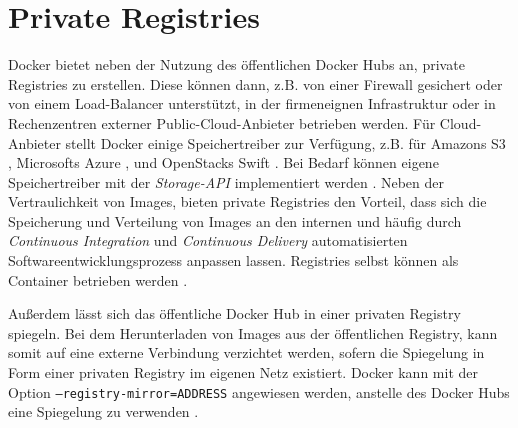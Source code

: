 \documentclass[../main.tex]{subfiles}
\begin{document}



  \section{Private Registries}
    Docker bietet neben der Nutzung des öffentlichen Docker Hubs an, private Registries zu erstellen. Diese können dann, z.B. von einer Firewall gesichert oder von einem Load-Balancer unterstützt, in der firmeneignen Infrastruktur oder in Rechenzentren externer Public-Cloud-Anbieter betrieben werden. Für Cloud-Anbieter stellt Docker einige Speichertreiber zur Verfügung, z.B. für Amazons S3 \cite{dockerStorageDriverS3}, Microsofts Azure \cite{dockerStorageDriverAzure}, und OpenStacks Swift \cite{dockerStorageDriverSwift}. Bei Bedarf können eigene Speichertreiber mit der \emph{Storage-API} implementiert werden \cite{dockerStorageDriver}.
    Neben der Vertraulichkeit von Images, bieten private Registries den Vorteil, dass sich die Speicherung und Verteilung von Images an den internen und häufig durch \emph{Continuous Integration} und \emph{Continuous Delivery} automatisierten Softwareentwicklungsprozess anpassen lassen. Registries selbst können als Container betrieben werden \cite{dockerRegistry}.

    Außerdem lässt sich das öffentliche Docker Hub in einer privaten Registry spiegeln. Bei dem Herunterladen von Images aus der öffentlichen Registry, kann somit auf eine externe Verbindung verzichtet werden, sofern die Spiegelung in Form einer privaten Registry im eigenen Netz existiert. Docker kann mit der Option \texttt{--registry-mirror=ADDRESS} angewiesen werden, anstelle des Docker Hubs eine Spiegelung zu verwenden \cite{dockerRegistryMirror}.
\end{document}
